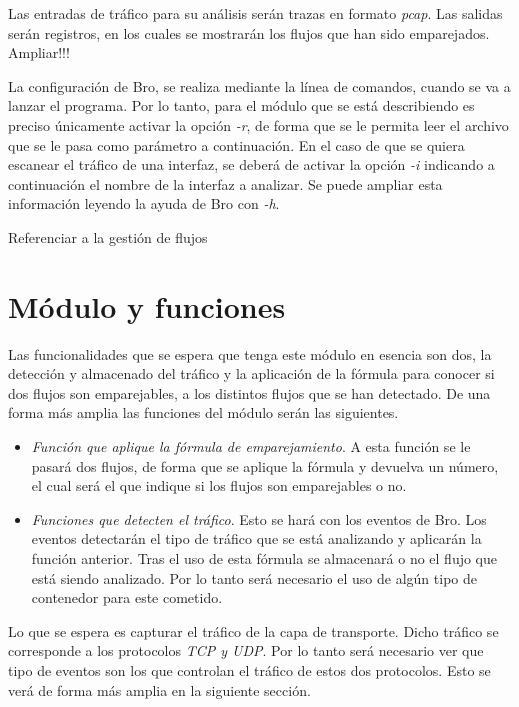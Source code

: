 \intro Las entradas de tráfico para su análisis serán trazas en formato \textit{pcap}. Las salidas serán registros, en los cuales se mostrarán los flujos que han sido emparejados. Ampliar!!!

\intro La configuración de Bro, se realiza mediante la línea de comandos, cuando se va a lanzar el programa. Por lo tanto, para el 
módulo que se está describiendo es preciso únicamente activar la opción \textit{-r}, de forma que se le permita leer el archivo que se 
le pasa como parámetro a continuación. En el caso de que se quiera escanear el tráfico de una interfaz, se deberá de activar la opción 
\textit{-i} indicando a continuación el nombre de la interfaz a analizar. Se puede ampliar esta información leyendo la ayuda de Bro con \textit{-h}.

\intro Referenciar a la gestión de flujos

\section{Módulo y funciones}

Las funcionalidades que se espera que tenga este módulo en esencia son dos, la detección y almacenado 
del tráfico y la aplicación de la fórmula para conocer si dos flujos son emparejables, a los distintos flujos que 
se han detectado. De una forma más amplia las funciones del módulo serán las siguientes. 

\begin{itemize}
\item \textit{Función que aplique la fórmula de emparejamiento}. 
\intro A esta función se le pasará dos flujos, de forma que se aplique la fórmula y devuelva un número, el cual 
será el que indique si los flujos son emparejables o no.
\item \textit{Funciones que detecten el tráfico}. 
\intro Esto se hará con los eventos de Bro. Los eventos detectarán el tipo de tráfico que se está analizando 
y aplicarán la función anterior.
\intro Tras el uso de esta fórmula se almacenará o no el flujo que está siendo analizado. Por lo tanto 
será necesario el uso de algún tipo de contenedor para este cometido.
\end{itemize}

\intro Lo que se espera es capturar el tráfico de la capa de transporte. Dicho tráfico se corresponde a los 
protocolos \textit{TCP y UDP}. Por lo tanto será necesario ver que tipo de eventos son los que controlan el tráfico 
de estos dos protocolos. Esto se verá de forma más amplia en la siguiente sección.

